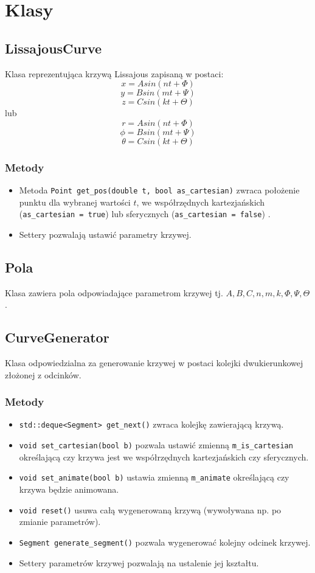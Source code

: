 


	\section{Klasy}
		\subsection{LissajousCurve}
			Klasa reprezentująca krzywą Lissajous zapisaną w postaci:
			$$
				x = Asin(nt + \Phi)
			$$
			$$
				y = Bsin(mt + \Psi)
			$$
			$$
				z = Csin(kt + \Theta)
			$$
			lub
			$$
				r = Asin(nt + \Phi)
			$$
			$$
				\phi = Bsin(mt + \Psi)
			$$
			$$
				\theta = Csin(kt + \Theta)
			$$
			\subsubsection{Metody}
				\begin{itemize}
					\item Metoda \lstinline|Point get_pos(double t, bool as_cartesian)| zwraca położenie punktu dla wybranej wartości $t$, we współrzędnych kartezjańskich (\lstinline|as_cartesian = true|) lub sferycznych
							(\lstinline|as_cartesian = false|)	.
					\item Settery pozwalają ustawić parametry krzywej.
				\end{itemize}
			\subsection{Pola}
				Klasa zawiera pola odpowiadające parametrom krzywej tj. $A, B, C, n, m, k, \Phi, \Psi, \Theta$.	
		\subsection{CurveGenerator}
			Klasa odpowiedzialna za generowanie krzywej w postaci kolejki dwukierunkowej złożonej z odcinków.
			\subsubsection{Metody}
				\begin{itemize}
					\item \lstinline|std::deque<Segment> get_next()| zwraca kolejkę zawierającą krzywą.
					\item \lstinline|void set_cartesian(bool b)| pozwala ustawić zmienną \lstinline|m_is_cartesian| określającą czy krzywa jest we współrzędnych kartezjańskich czy sferycznych.
					\item \lstinline|void set_animate(bool b)| ustawia zmienną \lstinline|m_animate| określającą czy krzywa będzie animowana.
					\item \lstinline|void reset()| usuwa całą wygenerowaną krzywą (wywoływana np. po zmianie parametrów).
					\item \lstinline|Segment generate_segment()| pozwala wygenerować kolejny odcinek krzywej.					
					\item Settery parametrów krzywej pozwalają na ustalenie jej kształtu.
				\end{itemize}
